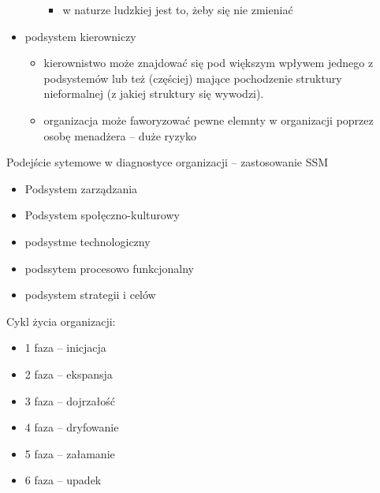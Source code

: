 \documentclass[a4paper,10pt]{report}
\begin{document}
\begin{itemize}
\begin{itemize}
		\begin{itemize}
			\item w naturze ludzkiej jest to, żeby się nie zmieniać
		\end{itemize}
	\end{itemize}
	\item podsystem kierowniczy
	\begin{itemize}
		\item kierownistwo może znajdować się pod większym wpływem jednego z podsystemów lub też (częściej) mające pochodzenie struktury nieformalnej (z jakiej struktury się wywodzi).
		\item organizacja może faworyzować pewne elemnty w organizacji poprzez osobę menadżera -- duże ryzyko
	\end{itemize}
\end{itemize}

\noindent Podejście sytemowe w diagnostyce organizacji -- zastosowanie SSM
\begin{itemize}
	\item Podsystem zarządzania
	\item Podsystem społęczno-kulturowy
	\item podsystme technologiczny
	\item podssytem procesowo funkcjonalny
	\item podsystem strategii i celów
\end{itemize}

\noindent Cykl życia organizacji:
\begin{itemize}
	\item 1 faza -- inicjacja
	\item 2 faza -- ekspansja
	\item 3 faza -- dojrzałość
	\item 4 faza -- dryfowanie
	\item 5 faza -- załamanie
	\item 6 faza -- upadek
\end{itemize}
\end{document}
